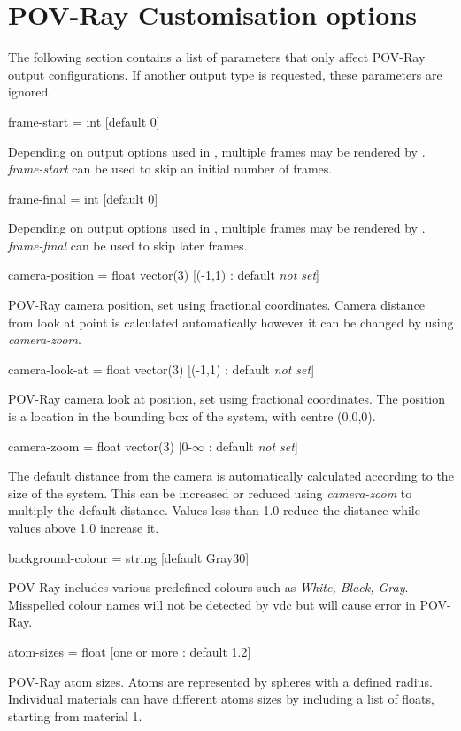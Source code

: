 \section*{POV-Ray Customisation options}

The following section contains a list of parameters that only affect POV-Ray
output configurations. If another output type is requested, these parameters
are ignored.

{\zicf frame-start = int [default 0]}
 Depending on
output options used in \vampire, multiple frames may be rendered by \vdc.
\textit{frame-start} can be used to skip an initial number of frames.

{\zicf frame-final = int [default 0]}
 Depending on
output options used in \vampire, multiple frames may be rendered by \vdc.
\textit{frame-final} can be used to skip later frames.

{\zicf camera-position = float vector(3) [(-1,1) : default \textit{not set}]}
 POV-Ray camera
position, set using fractional coordinates. Camera distance from look at point
is calculated automatically however it can be changed by using
\textit{camera-zoom}.

{\zicf camera-look-at = float vector(3) [(-1,1) : default \textit{not set}]}
 POV-Ray camera
look at position, set using fractional coordinates. The position is a location
in the bounding box of the system, with centre (0,0,0).

{\zicf camera-zoom = float vector(3) [0-$\infty$ : default \textit{not set}]}
 The default
distance from the camera is automatically calculated according to the size of
the system. This can be increased or reduced using \textit{camera-zoom} to
multiply the default distance. Values less than 1.0 reduce the distance while
values above 1.0 increase it.

{\zicf background-colour = string [default Gray30]}
 POV-Ray
includes various predefined colours such as \textit{White, Black, Gray}.
Misspelled colour names will not be detected by vdc but will cause error
in POV-Ray.

{\zicf atom-sizes = float [one or more : default 1.2]}
 POV-Ray atom sizes.
Atoms are represented by spheres with a defined radius. Individual materials can
have different atoms sizes by including a list of floats, starting from
material 1.

